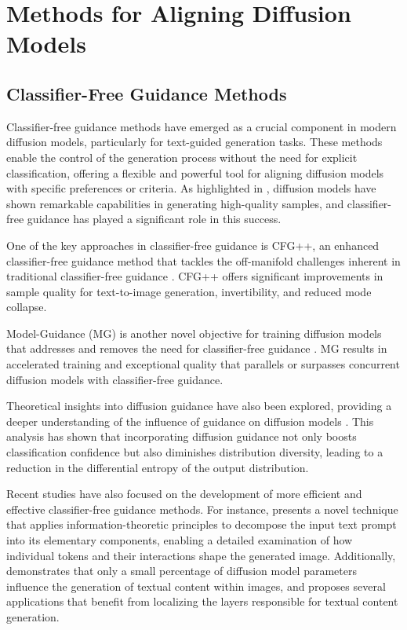 \documentclass[11pt,a4paper]{article}
\begin{document}
\section{Methods for Aligning Diffusion Models}



\subsection{Classifier-Free Guidance Methods}


Classifier-free guidance methods have emerged as a crucial component in modern diffusion models, particularly for text-guided generation tasks. These methods enable the control of the generation process without the need for explicit classification, offering a flexible and powerful tool for aligning diffusion models with specific preferences or criteria. As highlighted in \cite{doi:10.1145/3626235}, diffusion models have shown remarkable capabilities in generating high-quality samples, and classifier-free guidance has played a significant role in this success.

One of the key approaches in classifier-free guidance is CFG++, an enhanced classifier-free guidance method that tackles the off-manifold challenges inherent in traditional classifier-free guidance \cite{arxiv:2406.08070}. CFG++ offers significant improvements in sample quality for text-to-image generation, invertibility, and reduced mode collapse. 

Model-Guidance (MG) is another novel objective for training diffusion models that addresses and removes the need for classifier-free guidance \cite{doi:10.1109/iccv51070.2023.00713}. MG results in accelerated training and exceptional quality that parallels or surpasses concurrent diffusion models with classifier-free guidance. 

Theoretical insights into diffusion guidance have also been explored, providing a deeper understanding of the influence of guidance on diffusion models \cite{arxiv:2403.01639}. This analysis has shown that incorporating diffusion guidance not only boosts classification confidence but also diminishes distribution diversity, leading to a reduction in the differential entropy of the output distribution. 

Recent studies have also focused on the development of more efficient and effective classifier-free guidance methods. For instance, \cite{arxiv:2406.05191} presents a novel technique that applies information-theoretic principles to decompose the input text prompt into its elementary components, enabling a detailed examination of how individual tokens and their interactions shape the generated image. Additionally, \cite{arxiv:2502.09935} demonstrates that only a small percentage of diffusion model parameters influence the generation of textual content within images, and proposes several applications that benefit from localizing the layers responsible for textual content generation.
\end{document}

